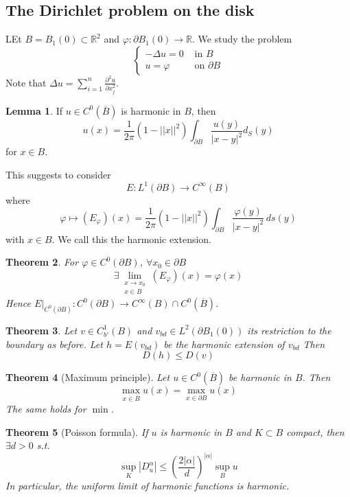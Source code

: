 \documentclass[a4paper, 12pt]{article}
\theoremstyle{plain}
\newtheorem{theorem}{Theorem}[section] %
\theoremstyle{definition}
\theoremstyle{lemma}
\newtheorem{lemma}[theorem]{Lemma}
\theoremstyle{remark}
\theoremstyle{corollary}
\theoremstyle{example}
\begin{document}
	\subsection{The Dirichlet problem on the disk}
	LEt $B = B_1(0) \subset \mathbb{R}^2$ and $\varphi: \partial B_1(0)  \to \mathbb{R}$. We study the problem \[\begin{cases}
		-\Delta u = 0 & \text{ in } B\\
		u = \varphi & \text{ on } \partial B
	\end{cases}\]
	Note that $\Delta u = \sum_{i=1}^{n} \frac{\partial^2 u}{\partial x_j^2}$.
	\begin{lemma}
		If $u \in C^0(\overline{B})$ is harmonic in $B$, then \[u(x) = \frac{1}{2\pi} (1-||x||^2) \int_{\partial B} \frac{u(y)}{\left|x-y\right|^2} d_S(y)\] for $x\in B$.
	\end{lemma}
	This suggests to consider \[E: L^1(\partial B) \to C^\infty(B)\] where \[\varphi \mapsto (E_\varphi)(x) = \frac{1}{2\pi}(1-||x||^2)\int_{\partial B} \frac{\varphi(y)}{\left|x-y\right|^2} \, ds(y)\] with $x\in B$. We call this the harmonic extension.
	\begin{theorem}
		For $\varphi \in C^0(\partial B)$, $\forall x_0 \in \partial B$ $$\exists \lim_{\substack{x \to x_0 \\ x \in B}} (E_\varphi)(x) = \varphi(x)$$ Hence $E|_{C^0(\partial B)}: C^0(\partial B) \to C^\infty(B) \cap C^0(\overline{B})$.
	\end{theorem}
	\begin{theorem}
		Let $v \in C^1_{b'}(B)$ and $v_{bd} \in L^2(\partial B_1(0))$ its restriction to the boundary as before. Let $h = E(v_{bd})$ be the harmonic extension of $v_{bd}$ Then \[D(h) \leq D(v)\]
	\end{theorem}
	\begin{theorem}[Maximum principle]
		Let $u \in C^0(\overline{B})$ be harmonic in $B$. Then \[\max_{x \in \overline{B}} u(x) = \max_{x \in \partial B} u(x)\] The same holds for $\min$.
	\end{theorem}
	\begin{theorem}[Poisson formula]
		If $u$ is harmonic in $B$ and $K\subset B$ compact, then $\exists d > 0$ s.t. \[\sup_{K} \left|D^\alpha_u\right| \leq \left(\frac{2\left|\alpha\right|}{d}\right)^{\left|\alpha\right|} \sup_B u\] In particular, the uniform limit of harmonic functions is harmonic.
	\end{theorem}
\end{document}
